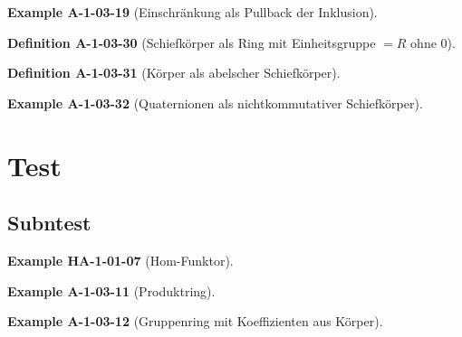 \documentclass[10pt, letterpaper]{article}
\newcommand{\CustomHeading}[3]{%
  \par\medskip\noindent%
  \textbf{#1 #2} \textnormal{(#3)}.\enskip%
}
\newenvironment{DEF}[2]{\CustomHeading{Definition}{#1}{#2}}{}
\newenvironment{EXA}[2]{\CustomHeading{Example}{#1}{#2}}{}
\begin{document}
\begin{EXA}{A-1-03-19}{Einschränkung als Pullback der Inklusion}
\end{EXA}


\begin{DEF}{A-1-03-30}{Schiefkörper als Ring mit Einheitsgruppe $= R$ ohne $0$}
\end{DEF}


\begin{DEF}{A-1-03-31}{Körper als abelscher Schiefkörper}
\end{DEF}


\begin{EXA}{A-1-03-32}{Quaternionen als nichtkommutativer Schiefkörper}
\end{EXA}

\section{Test}

\subsection{Subntest}


\begin{EXA}{HA-1-01-07}{Hom-Funktor}
\end{EXA}


\begin{EXA}{A-1-03-11}{Produktring}
\end{EXA}


\begin{EXA}{A-1-03-12}{Gruppenring mit Koeffizienten aus Körper}
\end{EXA}
\end{document}
